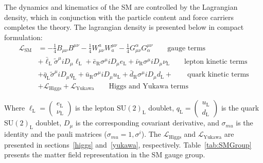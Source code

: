 The dynamics and kinematics of the SM are controlled by the
Lagrangian density, which in conjunction with the particle content and
force carriers completes the theory. The lagrangian density is
presented below in compact formulation:
\begin{equation}
 \begin{aligned}
        \mathcal{L}_{\mathrm{SM}}& = -\frac{1}{4}B_{\mu\nu}B^{\mu\nu}
        -\frac{1}{4}W^{a}_{\mu\nu}W^{\mu\nu}_{a} - \frac{1}{4}G^{\alpha}_{\mu\nu}G^{\mu\nu}_{\alpha} 
        \qquad \text{gauge terms}\\
        &+\bar{\ell}_{\mathrm{L}}\tilde{\sigma}^{\mu}iD_{\mu}\ell_{\mathrm{L}}
        +\bar{e}_{\mathrm{R}}\sigma^{\mu}iD_{\mu}e_{\mathrm{L}} +
        \bar{\nu}_{\mathrm{R}}\sigma^{\mu}iD_{\mu}\nu_{\mathrm{L}} \qquad \text{lepton kinetic terms}\\
        &+\bar{q}_{\mathrm{L}}\tilde{\sigma}^{\mu}iD_{\mu}q_{\mathrm{L}}
        +\bar{u}_{\mathrm{R}}\sigma^{\mu}iD_{\mu}u_{\mathrm{L}} +
        \bar{d}_{\mathrm{R}}\sigma^{\mu}iD_{\mu}d_{\mathrm{L}} + \qquad \text{quark kinetic terms}\\
        &+\mathcal{L}_{\mathrm{Higgs}} +
        \mathcal{L}_{\mathrm{Yukawa}}\qquad \text{Higgs and Yukawa terms}
       \end{aligned}
\label{eq:theSMlagrangian}
\end{equation}

Where $\ell_{\mathrm{L}}=\begin{pmatrix}e_{\mathrm{L}}\\
  \nu_{\mathrm{L}}\end{pmatrix}$ is the lepton $\mathrm{SU(2)_{L}}$
doublet, $q_{\mathrm{L}}=\begin{pmatrix}u_{\mathrm{L}}\\
  d_{\mathrm{L}}\end{pmatrix}$ is the quark $\mathrm{SU(2)_{L}}$
doublet, $D_{\mu}$ is the corresponding covariant derivative, and
 $\sigma_{mu}$ is the identity and the pauli matrices ($\sigma_{mu} = {1,\sigma^{i}}$).
The $\mathcal{L}_{\mathrm{Higgs}}$ and $\mathcal{L}_{\mathrm{Yukawa}}$
are presented in sections~\ref{higgs} and~\ref{yukawa}, respectively.
Table~\ref{tab:SMGroup} presents the matter field representation in
the SM gauge group.

